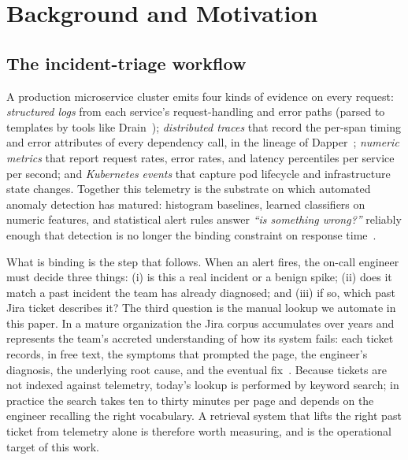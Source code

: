 
\section{Background and Motivation}
\label{sec:background}

\subsection{The incident-triage workflow}
\label{sec:background:workflow}

A production microservice cluster emits four kinds of evidence on every request: \emph{structured logs} from each service's request-handling and error paths (parsed to templates by tools like Drain~\cite{drain}); \emph{distributed traces} that record the per-span timing and error attributes of every dependency call, in the lineage of Dapper~\cite{dapper}; \emph{numeric metrics} that report request rates, error rates, and latency percentiles per service per second; and \emph{Kubernetes events} that capture pod lifecycle and infrastructure state changes. Together this telemetry is the substrate on which automated anomaly detection has matured: histogram baselines, learned classifiers on numeric features, and statistical alert rules answer \emph{``is something wrong?''} reliably enough that detection is no longer the binding constraint on response time~\cite{notaro2021aiops,loganalysis-survey}.

What is binding is the step that follows. When an alert fires, the on-call engineer must decide three things: (i) is this a real incident or a benign spike; (ii) does it match a past incident the team has already diagnosed; and (iii) if so, which past Jira ticket describes it? The third question is the manual lookup we automate in this paper. In a mature organization the Jira corpus accumulates over years and represents the team's accreted understanding of how its system fails: each ticket records, in free text, the symptoms that prompted the page, the engineer's diagnosis, the underlying root cause, and the eventual fix~\cite{jira}. Because tickets are not indexed against telemetry, today's lookup is performed by keyword search; in practice the search takes ten to thirty minutes per page and depends on the engineer recalling the right vocabulary. A retrieval system that lifts the right past ticket from telemetry alone is therefore worth measuring, and is the operational target of this work.

